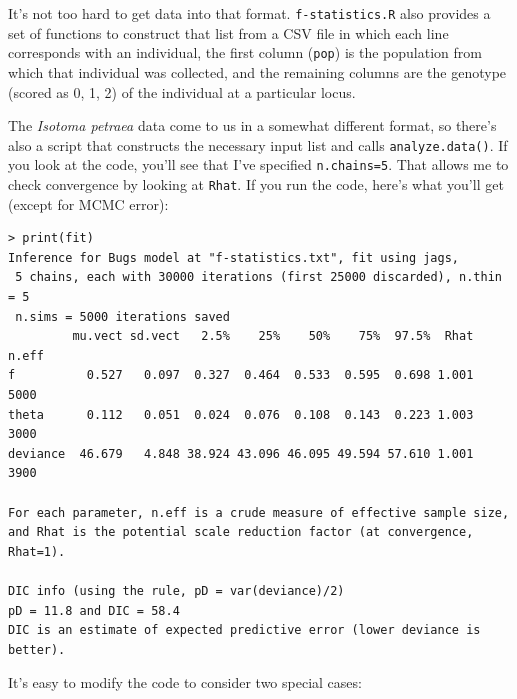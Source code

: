 It's not too hard to get data into that format. {\tt f-statistics.R}
also provides a set of functions to construct that list from a CSV
file in which each line corresponds with an individual, the first
column ({\tt pop}) is the population from which that individual was
collected, and the remaining columns are the genotype (scored as 0, 1,
2) of the individual at a particular locus.

The {\it Isotoma petraea\/} data come to us in a somewhat different
format, so there's also a script that constructs the necessary input
list and calls {\tt analyze.data()}. If you look at the code, you'll
see that I've specified {\tt n.chains=5}. That allows me to check
convergence by looking at {\tt Rhat}. If you run the code, here's what
you'll get (except for MCMC error):
\begin{verbatim}
> print(fit)
Inference for Bugs model at "f-statistics.txt", fit using jags,
 5 chains, each with 30000 iterations (first 25000 discarded), n.thin = 5
 n.sims = 5000 iterations saved
         mu.vect sd.vect   2.5%    25%    50%    75%  97.5%  Rhat n.eff
f          0.527   0.097  0.327  0.464  0.533  0.595  0.698 1.001  5000
theta      0.112   0.051  0.024  0.076  0.108  0.143  0.223 1.003  3000
deviance  46.679   4.848 38.924 43.096 46.095 49.594 57.610 1.001  3900

For each parameter, n.eff is a crude measure of effective sample size,
and Rhat is the potential scale reduction factor (at convergence, Rhat=1).

DIC info (using the rule, pD = var(deviance)/2)
pD = 11.8 and DIC = 58.4
DIC is an estimate of expected predictive error (lower deviance is better).
\end{verbatim}

It's easy to modify the code to consider two special cases:

